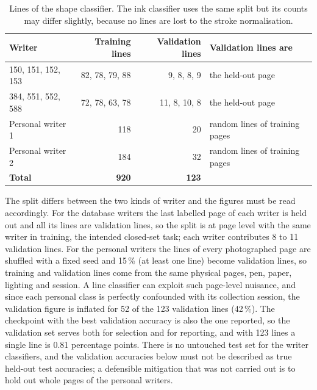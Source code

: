 \begin{table}[h]
\centering
\fontsize{9.5}{11.5}\selectfont
\begin{tabular}{|l|r|r|l|}
\hline
\textbf{Writer} & \textbf{Training lines} & \textbf{Validation lines} & \textbf{Validation lines are} \\
\hline
150, 151, 152, 153 & 82, 78, 79, 88 & 9, 8, 8, 9 & the held-out page \\
384, 551, 552, 588 & 72, 78, 63, 78 & 11, 8, 10, 8 & the held-out page \\
Personal writer 1 & 118 & 20 & random lines of training pages \\
Personal writer 2 & 184 & 32 & random lines of training pages \\
\hline
\textbf{Total} & \textbf{920} & \textbf{123} & \\
\hline
\end{tabular}
\caption{Lines of the shape classifier. The ink classifier uses the same split but its counts may differ slightly, because no lines are lost to the stroke normalisation.}
\label{tab:wid-data}
\end{table}

The split differs between the two kinds of writer and the figures must be read accordingly. For the database writers the last labelled page of each writer is held out and all its lines are validation lines, so the split is at page level with the same writer in training, the intended closed-set task; each writer contributes 8 to 11 validation lines.
For the personal writers the lines of every photographed page are shuffled with a fixed seed and 15\,\% (at least one line) become validation lines, so training and validation lines come from the same physical pages, pen, paper, lighting and session.
A line classifier can exploit such page-level nuisance, and since each personal class is perfectly confounded with its collection session, the validation figure is inflated for 52 of the 123 validation lines (42\,\%).
The checkpoint with the best validation accuracy is also the one reported, so the validation set serves both for selection and for reporting, and with 123 lines a single line is 0.81 percentage points. There is no untouched test set for the writer classifiers, and the validation accuracies below must not be described as true held-out test accuracies; a defensible mitigation that was not carried out is to hold out whole pages of the personal writers.

